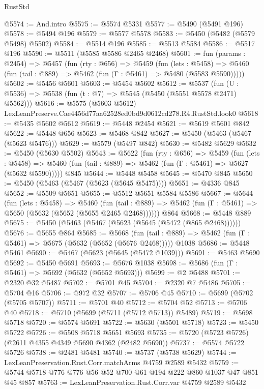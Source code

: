 \begin{lexlean}{RustStd}
\begin{coremodule}
@5574 := And.intro
@5575 := @5574 @5331
@5577 := @5490 (@5491 @196)
@5578 := @5494 @196
@5579 := @5577 @5578
@5583 := @5450 (@5482 (@5579 @5498) @5502)
@5584 := @5514 @196
@5585 := @5513 @5584
@5586 := @5517 @196
@5590 := @5511 (@5585 @5586 @2465 @2468)
@5601 := fun (params : @2454) =>
  @5457
    (fun (rty : @656) =>
    @5459
      (fun (lets : @5458) =>
      @5460 (fun (tail : @889) => @5462 (fun (Γ : @5461) => @5480 (@5583 @5590)))))
@5602 := @5456 @5601
@5603 := @5454 @5602
@5612 := @5537 (fun (U : @5536) => @5538 (fun (t : @7) => @5545 (@5450 (@5551 @5578 @2471) @5562)))
@5616 := @5575 (@5603 @5612) LexLeanPreserve.Cae4456d77aa62528ed0bd9d0612cd278.R4.RustStd.look0
@5618 := @5435 @5602 @5612
@5619 := @5448 @2454
@5621 := @5619 @5601 @842
@5622 := @5448 @656
@5623 := @5468 @842
@5627 := @5450 (@5463 (@5467 (@5623 @5476)))
@5629 := @5579 (@5497 @842)
@5630 := @5482 @5629
@5632 := @5450 (@5630 @5502)
@5643 := @5622
    (fun (rty : @656) =>
    @5459
      (fun (lets : @5458) =>
      @5460 (fun (tail : @889) => @5462 (fun (Γ : @5461) => @5627 (@5632 @5590)))))
    @845
@5644 := @5448 @5458
@5645 := @5470 @845
@5650 := @5450 (@5463 (@5467 (@5623 (@5645 @5475))))
@5651 := @4336 @845
@5652 := @5509 @5651
@5655 := @5512 @5651 @5584 @5586
@5667 := @5644
    (fun (lets : @5458) =>
    @5460
      (fun (tail : @889) => @5462 (fun (Γ : @5461) => @5650 (@5632 (@5652 (@5655 @2465 @2468))))))
    @864
@5668 := @5448 @889
@5675 := @5450 (@5463 (@5467 (@5623 (@5645 (@5472 (@865 @2468))))))
@5676 := @5655 @864
@5685 := @5668
    (fun (tail : @889) => @5462 (fun (Γ : @5461) => @5675 (@5632 (@5652 (@5676 @2468)))))
    @1038
@5686 := @5448 @5461
@5690 := @5467 (@5623 (@5645 (@5472 @1039)))
@5691 := @5463 @5690
@5692 := @5450 @5691
@5693 := @5676 @1038
@5698 := @5686 (fun (Γ : @5461) => @5692 (@5632 (@5652 @5693)))
@5699 := @2 @5488
@5701 := @2320 @32 @5487
@5702 := @5701 @45
@5704 := @2320 @7 @5486
@5705 := @5704 @16
@5706 := @972 @32
@5707 := @5706 @45
@5710 := @5699 (@5702 (@5705 @5707))
@5711 := @5701 @40
@5712 := @5704 @52
@5713 := @5706 @40
@5718 := @5710 (@5699 (@5711 (@5712 @5713)) @5489)
@5719 := @5698 @5718
@5720 := @5574 @5691
@5722 := @5630 (@5501 @5718)
@5723 := @5450 @5722
@5726 := @5508 @5718 @5651 @5693
@5735 := @5720 (@5723 @5726) (@2611 @4355 @4349 @5690 @4362 (@2482 @5690))
@5737 := @5574 @5722 @5726
@5738 := @2481 @5481
@5740 := @5737 (@5738 @5629)
@5744 := LexLeanPreservation.Rust.Corr.matchArms @4759 @2589 @5432
@5759 := @5744 @5718 @776 @776 @56 @52 @700 @61 @194 @222 @860 @1037 @47 @851 @45 @857
@5763 := LexLeanPreservation.Rust.Corr.var @4759 @2589 @5432

\end{coremodule}
\end{lexlean}
